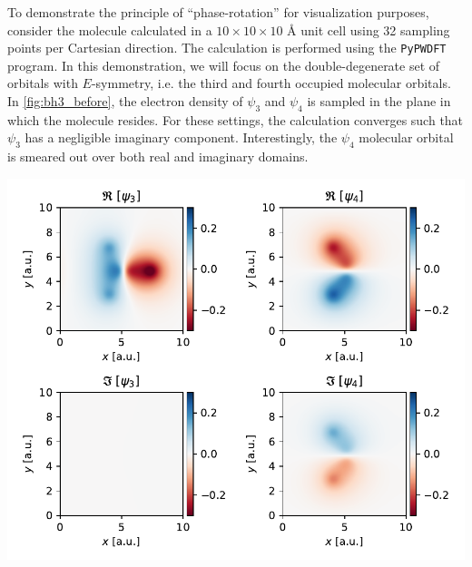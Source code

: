 To demonstrate the principle of ``phase-rotation'' for visualization purposes, consider the  molecule calculated in a $10 \times 10 \times 10$ \AA\; unit cell using 32 sampling points per Cartesian direction. The calculation is performed using the \texttt{PyPWDFT}\cite{pypwdft} program. In this demonstration, we will focus on the double-degenerate set of orbitals with $E$-symmetry, i.e. the third and fourth occupied molecular orbitals. In \cref{fig:bh3_before}, the electron density of $\psi_{3}$ and $\psi_{4}$ is sampled in the plane in which the  molecule resides. For these settings, the calculation converges such that $\psi_{3}$ has a negligible imaginary component. Interestingly, the $\psi_{4}$ molecular orbital is smeared out over both real and imaginary domains. 

\begin{Figure}
    \centering
    \includegraphics[width=\linewidth]{img/fig9.pdf}
    \label{fig:bh3_before}
\end{Figure}


